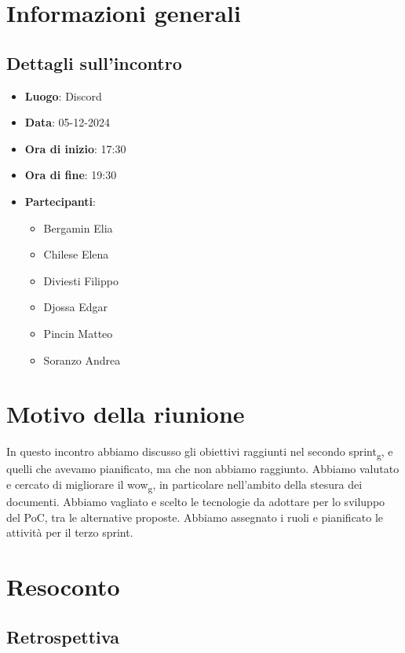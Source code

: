 \section{Informazioni generali}
    \subsection{Dettagli sull'incontro}
        \begin{itemize}
            \item \textbf{Luogo}: Discord
            \item \textbf{Data}: 05-12-2024
            \item \textbf{Ora di inizio}: 17:30
            \item \textbf{Ora di fine}: 19:30
            \item \textbf{Partecipanti}:
                \begin{itemize}
                    \item Bergamin Elia
                    \item Chilese Elena
                    \item Diviesti Filippo
                    \item Djossa Edgar
                    \item Pincin Matteo
                    \item Soranzo Andrea
                \end{itemize}
        \end{itemize}

\section{Motivo della riunione}
    In questo incontro abbiamo discusso gli obiettivi raggiunti nel secondo sprint\textsubscript{g},
    e quelli che avevamo pianificato, ma che non abbiamo raggiunto. 
    Abbiamo valutato e cercato di migliorare il wow\textsubscript{g}, in particolare
    nell'ambito della stesura dei documenti. 
    Abbiamo vagliato e scelto le tecnologie da adottare per lo sviluppo del PoC, 
    tra le alternative proposte.
    Abbiamo assegnato i ruoli e pianificato le attività per il terzo sprint.

\section{Resoconto}
    \subsection{Retrospettiva}
